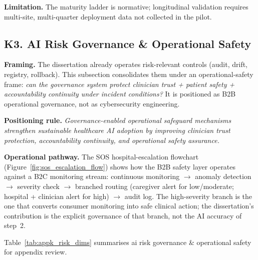 \noindent\textbf{Limitation.} The maturity ladder is normative; longitudinal validation requires multi-site, multi-quarter deployment data not collected in the pilot.

\subsection*{K3. AI Risk Governance \& Operational Safety}
\label{sec:appk_risk}

\noindent\textbf{Framing.} The dissertation already operates risk-relevant controls (audit, drift, registry, rollback). This subsection consolidates them under an operational-safety frame: \emph{can the governance system protect clinician trust + patient safety + accountability continuity under incident conditions?} It is positioned as B2B operational governance, not as cybersecurity engineering.

\noindent\textbf{Positioning rule.} \emph{Governance-enabled operational safeguard mechanisms strengthen sustainable healthcare AI adoption by improving clinician trust protection, accountability continuity, and operational safety assurance.}

\noindent\textbf{Operational pathway.} The SOS hospital-escalation flowchart (Figure~\ref{fig:sos_escalation_flow}) shows how the B2B safety layer operates against a B2C monitoring stream: continuous monitoring $\to$ anomaly detection $\to$ severity check $\to$ branched routing (caregiver alert for low/moderate; hospital + clinician alert for high) $\to$ audit log. The high-severity branch is the one that converts consumer monitoring into safe clinical action; the dissertation's contribution is the explicit governance of that branch, not the AI accuracy of step~2.




\noindent Table~\ref{tab:appk_risk_dims} summarises ai risk governance \& operational safety for appendix review.

